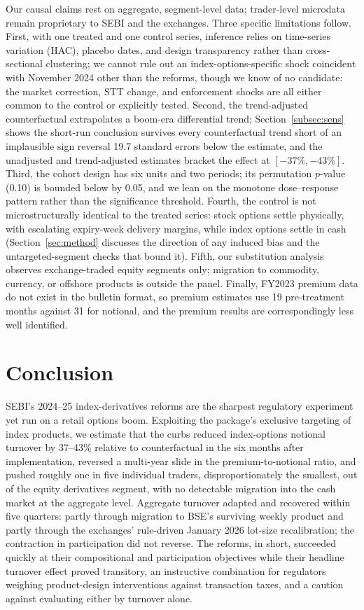 \documentclass[12pt]{article}
\begin{document}
Our causal claims rest on aggregate, segment-level data; trader-level
microdata remain proprietary to SEBI and the exchanges. Three specific
limitations follow. First, with one treated and one control series,
inference relies on time-series variation (HAC), placebo dates, and design
transparency rather than cross-sectional clustering; we cannot rule out an
index-options-specific shock coincident with November 2024 other than the
reforms, though we know of no candidate: the market correction, STT change,
and enforcement shocks are all either common to the control or explicitly
tested. Second, the trend-adjusted counterfactual extrapolates a boom-era
differential trend; Section~\ref{subsec:sens} shows the short-run
conclusion survives every counterfactual trend short of an implausible
sign reversal 19.7 standard errors below the estimate, and the
unadjusted and trend-adjusted estimates bracket the effect at
$[-37\%, -43\%]$. Third, the cohort design has six units and two
periods; its permutation $p$-value (0.10) is bounded below by 0.05, and we
lean on the monotone dose--response pattern rather than the significance
threshold. Fourth, the control is not microstructurally identical to the
treated series: stock options settle physically, with escalating
expiry-week delivery margins, while index options settle in cash
(Section~\ref{sec:method} discusses the direction of any induced bias and
the untargeted-segment checks that bound it). Fifth, our substitution
analysis observes exchange-traded equity segments only; migration to
commodity, currency, or offshore products is outside the panel. Finally,
FY2023 premium data do not exist in the bulletin format, so premium
estimates use 19 pre-treatment months against 31 for notional, and the
premium results are correspondingly less well identified.

\section{Conclusion}\label{sec:conclusion}

SEBI's 2024--25 index-derivatives reforms are the sharpest regulatory
experiment yet run on a retail options boom. Exploiting the package's
exclusive targeting of index products, we estimate that the curbs reduced
index-options notional turnover by 37--43\% relative to counterfactual
in the six months after implementation, reversed a multi-year slide in the
premium-to-notional ratio, and pushed roughly one in five individual
traders, disproportionately the smallest, out of the equity derivatives
segment, with no detectable migration into the cash market at the
aggregate level. Aggregate turnover adapted and recovered within five
quarters: partly through migration to BSE's surviving weekly product and
partly through the exchanges' rule-driven January 2026 lot-size
recalibration; the contraction in participation did not reverse. The reforms, in short, succeeded quickly at their
compositional and participation objectives while their headline turnover
effect proved transitory, an instructive combination for regulators
weighing product-design interventions against transaction taxes, and a
caution against evaluating either by turnover alone.
\end{document}
